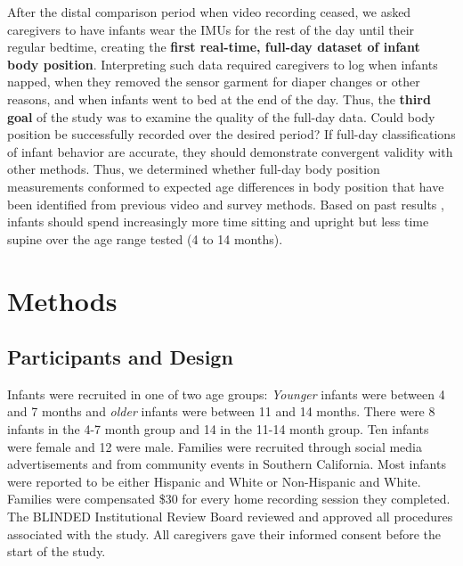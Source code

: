 \documentclass[
  man]{apa6}
\begin{document}
After the distal comparison period when video recording ceased, we asked caregivers to have infants wear the IMUs for the rest of the day until their regular bedtime, creating the \textbf{first real-time, full-day dataset of infant body position}. Interpreting such data required caregivers to log when infants napped, when they removed the sensor garment for diaper changes or other reasons, and when infants went to bed at the end of the day. Thus, the \textbf{third goal} of the study was to examine the quality of the full-day data. Could body position be successfully recorded over the desired period? If full-day classifications of infant behavior are accurate, they should demonstrate convergent validity with other methods. Thus, we determined whether full-day body position measurements conformed to expected age differences in body position that have been identified from previous video and survey methods. Based on past results \autocite{Survey}, infants should spend increasingly more time sitting and upright but less time supine over the age range tested (4 to 14 months).

\hypertarget{methods}{%
\section{Methods}\label{methods}}

\hypertarget{participants-and-design}{%
\subsection{Participants and Design}\label{participants-and-design}}

Infants were recruited in one of two age groups: \emph{Younger} infants were between 4 and 7 months and \emph{older} infants were between 11 and 14 months. There were 8 infants in the 4-7 month group and 14 in the 11-14 month group. Ten infants were female and 12 were male. Families were recruited through social media advertisements and from community events in Southern California. Most infants were reported to be either Hispanic and White or Non-Hispanic and White. Families were compensated \$30 for every home recording session they completed. The BLINDED Institutional Review Board reviewed and approved all procedures associated with the study. All caregivers gave their informed consent before the start of the study.
\end{document}
